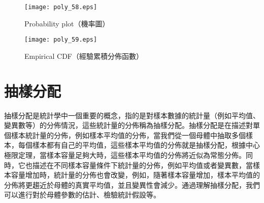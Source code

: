 \documentclass[12pt, a4paper]{article}
\begin{document}
\begin{figure}[H]
\centering
\texttt{[image: poly\_58.eps]}
\caption{Probability plot（機率圖）}
\label{fig:poly_58.eps}
\end{figure} 

\begin{figure}[H]
\centering
\texttt{[image: poly\_59.eps]}
\caption{Empirical CDF（經驗累積分佈函數）}
\label{fig:poly_59.eps}
\end{figure} 

\section{抽樣分配}
抽樣分配是統計學中一個重要的概念，指的是對樣本數據的統計量（例如平均值、變異數等）的分佈情況，這些統計量的分佈稱為抽樣分配。抽樣分配是在描述對單個樣本統計量的分佈，例如樣本平均值的分佈，當我們從一個母體中抽取多個樣本，每個樣本都有自己的平均值，這些樣本平均值的分佈就是抽樣分配，根據中心極限定理，當樣本容量足夠大時，這些樣本平均值的分佈將近似為常態分佈。同時，它也描述在不同樣本容量條件下統計量的分佈，例如平均值或者變異數，當樣本容量增加時，統計量的分佈也會改變，例如，隨著樣本容量增加，樣本平均值的分佈將更趨近於母體的真實平均值，並且變異性會減少。通過理解抽樣分配，我們可以進行對於母體參數的估計、檢驗統計假設等。
\end{document}
